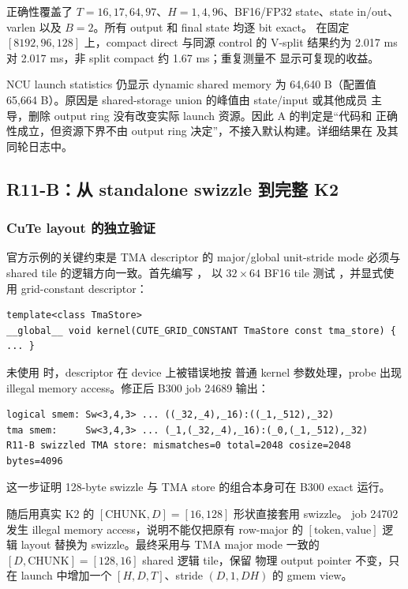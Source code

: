 正确性覆盖了 \(T=16,17,64,97\)、\(H=1,4,96\)、BF16/FP32 state、state
in/out、varlen 以及 \(B=2\)。所有 output 和 final state 均逐 bit exact。
在固定 \([8192,96,128]\) 上，compact direct 与同源 control 的 V-split
结果约为 2.017 ms 对 2.017 ms，非 split compact 约 1.67 ms；重复测量不
显示可复现的收益。

NCU launch statistics 仍显示 dynamic shared memory 为 64,640 B（配置值
65,664 B）。原因是 shared-storage union 的峰值由 state/input 或其他成员
主导，删除 output ring 没有改变实际 launch 资源。因此 A 的判定是“代码和
正确性成立，但资源下界不由 output ring 决定”，不接入默认构建。详细结果在
 及其同轮日志中。

\subsection{R11-B：从 standalone swizzle 到完整 K2}

\subsubsection{CuTe layout 的独立验证}

官方示例的关键约束是 TMA descriptor 的 major/global unit-stride mode 必须与
shared tile 的逻辑方向一致。首先编写 ，
以 \(32\times64\) BF16 tile 测试
，并显式使用 grid-constant descriptor：

\begin{lstlisting}
template<class TmaStore>
__global__ void kernel(CUTE_GRID_CONSTANT TmaStore const tma_store) { ... }
\end{lstlisting}

未使用  时，descriptor 在 device 上被错误地按
普通 kernel 参数处理，probe 出现 illegal memory access。修正后 B300 job
24689 输出：

\begin{lstlisting}
logical smem: Sw<3,4,3> ... ((_32,_4),_16):((_1,_512),_32)
tma smem:     Sw<3,4,3> ... (_1,(_32,_4),_16):(_0,(_1,_512),_32)
R11-B swizzled TMA store: mismatches=0 total=2048 cosize=2048 bytes=4096
\end{lstlisting}

这一步证明 128-byte swizzle 与 TMA store 的组合本身可在 B300 exact 运行。

随后用真实 K2 的 \([\text{CHUNK},D]=[16,128]\) 形状直接套用 swizzle。
job 24702 发生 illegal memory access，说明不能仅把原有 row-major 的
\([\text{token},\text{value}]\) 逻辑 layout 替换为 swizzle。最终采用与 TMA
major mode 一致的 \([D,\text{CHUNK}]=[128,16]\) shared 逻辑 tile，保留
物理 output pointer 不变，只在 launch 中增加一个 \([H,D,T]\)、stride
\((D,1,DH)\) 的 gmem view。

